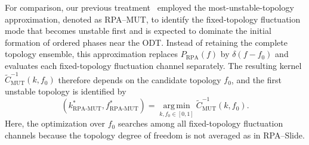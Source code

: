     For comparison, our previous treatment~\cite{Zhao2024Phase} employed the most-unstable-topology approximation, denoted as RPA--MUT, to identify the fixed-topology fluctuation mode that becomes unstable first and is expected to dominate the initial formation of ordered phases near the ODT.
    Instead of retaining the complete topology ensemble, this approximation replaces $P_{\mathrm{RPA}}(f)$ by $\delta(f-f_0)$ and evaluates each fixed-topology fluctuation channel separately.
    The resulting kernel $\widetilde C_{\mathrm{MUT}}^{-1}(k,f_0)$ therefore depends on the candidate topology $f_0$, and the first unstable topology is identified by
    \begin{equation}
        (k_{\mathrm{RPA\text{-}MUT}}^\ast,
        f_{\mathrm{RPA\text{-}MUT}}^\ast)
        =
        \operatorname*{arg\,min}_{k,f_0\in[0,1]}
        \widetilde C_{\mathrm{MUT}}^{-1}(k,f_0).
    \end{equation}
    Here, the optimization over $f_0$ searches among all fixed-topology fluctuation channels because the topology degree of freedom is not averaged as in RPA--Slide.
    

